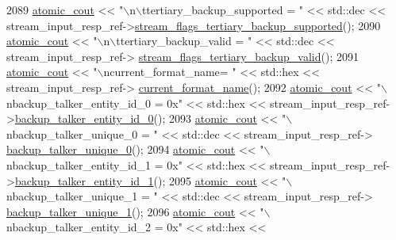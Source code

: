 \begin{DoxyCode}
2089             \hyperlink{cmd__line_8h_a0bc38ccc65c79ba06c6fcd7b4bf554c3}{atomic\_cout} << \textcolor{stringliteral}{"\(\backslash\)n\(\backslash\)ttertiary\_backup\_supported = "} << std::dec << 
      stream\_input\_resp\_ref->\hyperlink{classavdecc__lib_1_1stream__input__descriptor__response_abbd3928cc72f811f32fcb5a079f791b2}{stream\_flags\_tertiary\_backup\_supported}();
2090             \hyperlink{cmd__line_8h_a0bc38ccc65c79ba06c6fcd7b4bf554c3}{atomic\_cout} << \textcolor{stringliteral}{"\(\backslash\)n\(\backslash\)ttertiary\_backup\_valid = "} << std::dec << stream\_input\_resp\_ref->
      \hyperlink{classavdecc__lib_1_1stream__input__descriptor__response_a430a18cf3301728015f75d8a80676004}{stream\_flags\_tertiary\_backup\_valid}();
2091             \hyperlink{cmd__line_8h_a0bc38ccc65c79ba06c6fcd7b4bf554c3}{atomic\_cout} << \textcolor{stringliteral}{"\(\backslash\)ncurrent\_format\_name= "} << std::hex << stream\_input\_resp\_ref->
      \hyperlink{classavdecc__lib_1_1stream__input__descriptor__response_a24176b56bc0f1873b27d00565bc397c5}{current\_format\_name}();
2092             \hyperlink{cmd__line_8h_a0bc38ccc65c79ba06c6fcd7b4bf554c3}{atomic\_cout} << \textcolor{stringliteral}{"\(\backslash\)nbackup\_talker\_entity\_id\_0 = 0x"} << std::hex << 
      stream\_input\_resp\_ref->\hyperlink{classavdecc__lib_1_1stream__input__descriptor__response_acd4fa01e575dfb7160afc66a7cdffcc6}{backup\_talker\_entity\_id\_0}();
2093             \hyperlink{cmd__line_8h_a0bc38ccc65c79ba06c6fcd7b4bf554c3}{atomic\_cout} << \textcolor{stringliteral}{"\(\backslash\)nbackup\_talker\_unique\_0 = "} << std::dec << stream\_input\_resp\_ref->
      \hyperlink{classavdecc__lib_1_1stream__input__descriptor__response_acae31dc43b38d6c49acb2db4c8c23b8c}{backup\_talker\_unique\_0}();
2094             \hyperlink{cmd__line_8h_a0bc38ccc65c79ba06c6fcd7b4bf554c3}{atomic\_cout} << \textcolor{stringliteral}{"\(\backslash\)nbackup\_talker\_entity\_id\_1 = 0x"} << std::hex << 
      stream\_input\_resp\_ref->\hyperlink{classavdecc__lib_1_1stream__input__descriptor__response_af3e6b600303fa7833e2033ee228c751a}{backup\_talker\_entity\_id\_1}();
2095             \hyperlink{cmd__line_8h_a0bc38ccc65c79ba06c6fcd7b4bf554c3}{atomic\_cout} << \textcolor{stringliteral}{"\(\backslash\)nbackup\_talker\_unique\_1 = "} << std::dec << stream\_input\_resp\_ref->
      \hyperlink{classavdecc__lib_1_1stream__input__descriptor__response_a99963ab0e34ebf72203e8d20e8de1ab1}{backup\_talker\_unique\_1}();
2096             \hyperlink{cmd__line_8h_a0bc38ccc65c79ba06c6fcd7b4bf554c3}{atomic\_cout} << \textcolor{stringliteral}{"\(\backslash\)nbackup\_talker\_entity\_id\_2 = 0x"} << std::hex << 

\end{DoxyCode}

